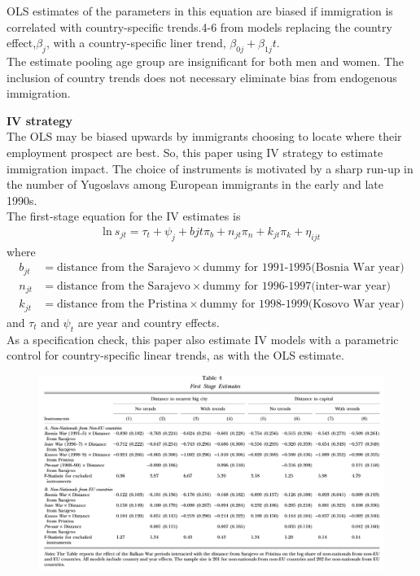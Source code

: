 \documentclass[../root]{subfiles}
\begin{document}
    OLS estimates of the parameters in this equation are biased if immigration is correlated with country-specific trends.4-6 from models replacing the country effect,$\beta_j$, with a country-specific liner trend, $\beta_{0j}+\beta_{1j}t$. \\
    The estimate pooling age group are insignificant for both men and women. The inclusion of country trends does not necessary eliminate bias from endogenous immigration.

    {\bf IV strategy} \\
    The OLS may be biased upwards by immigrants choosing to locate where their employment prospect are best. So, this paper using IV strategy to estimate immigration impact.
    The choice of instruments is motivated by a sharp run-up in the number of Yugoslavs among European immigrants in the early and late 1990s. \\
    The first-stage equation for the IV estimates is 
    \begin{align}
        \mbox{ln} \ s_{jt} = \tau_{t} + \psi_{j} +b{jt} \pi_{b}+n_{jt}\pi_n+k_{jt} \pi_{k} +\eta_{ijt}
    \end{align}
    where 
    \begin{align*}
        b_{jt}&=\mbox{distance from the Sarajevo} \times \mbox{dummy for 1991-1995(Bosnia War year)} \\
        n_{jt}&=\mbox{distance from the Sarajevo} \times \mbox{dummy for 1996-1997(inter-war year)} \\
        k_{jt}&=\mbox{distance from the Pristina} \times \mbox{dummy for 1998-1999(Kosovo War year)}
    \end{align*}
    and $\tau_t$ and $\psi_t$ are year and country effects. \\
    As a specification check, this paper also estimate IV models with a parametric control for country-specific linear trends, as with the OLS estimate. 
    \begin{figure}[h]
        \includegraphics[width=15cm]{0529sugiyama/Table4.png}
    \end{figure}
    
\end{document}
